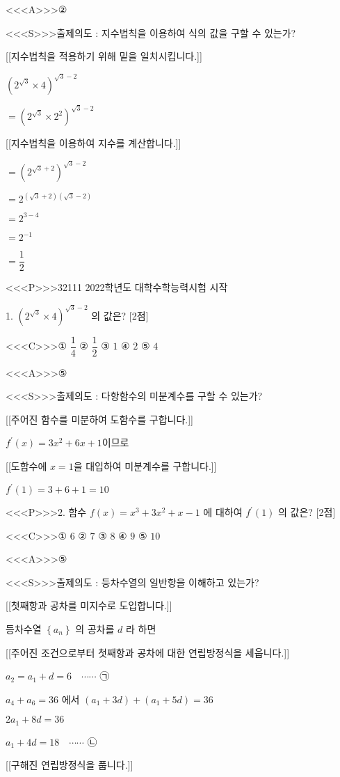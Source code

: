 \documentclass{oblivoir}
\begin{document}
<<<A>>>②

<<<S>>>출제의도 : 지수법칙을 이용하여 식의 값을 구할 수 있는가?

[[지수법칙을 적용하기 위해 밑을 일치시킵니다.]]

$\left(2^{\sqrt{3}} \times 4\right)^{\sqrt{3}-2}$

$=\left(2^{\sqrt{3}} \times 2^{2}\right)^{\sqrt{3}-2}$

[[지수법칙을 이용하여 지수를 계산합니다.]]

$=\left(2^{\sqrt{3}+2}\right)^{\sqrt{3}-2}$

$=2^{(\sqrt{3}+2)(\sqrt{3}-2)}$

$=2^{3-4}$

$=2^{-1}$

$=\dfrac{1}{2}$

<<<P>>>32111 2022학년도 대학수학능력시험 시작

1. $\left(2^{\sqrt{3}} \times 4\right)^{\sqrt{3}-2}$ 의 값은? [2점]

<<<C>>>① $\dfrac{1}{4}$
② $\dfrac{1}{2}$
③ $1$
④ $2$
⑤ $4$


<<<A>>>⑤

<<<S>>>출제의도 : 다항함수의 미분계수를 구할 수 있는가?

[[주어진 함수를 미분하여 도함수를 구합니다.]]

$f^{\prime}(x)=3 x^{2}+6 x+1$이므로

[[도함수에 $x=1$을 대입하여 미분계수를 구합니다.]]

$f^{\prime}(1)=3+6+1=10$

<<<P>>>2. 함수 $f(x)=x^{3}+3 x^{2}+x-1$ 에 대하여 $f^{\prime}(1)$ 의 값은? [2점]

<<<C>>>① $6$
② $7$
③ $8$
④ $9$
⑤ $10$

<<<A>>>⑤

<<<S>>>출제의도 : 등차수열의 일반항을 이해하고 있는가?

[[첫째항과 공차를 미지수로 도입합니다.]]

등차수열 $\left\{a_{n}\right\}$ 의 공차를 $d$ 라 하면

[[주어진 조건으로부터 첫째항과 공차에 대한 연립방정식을 세웁니다.]]

$a_{2}=a_{1}+d=6 \quad \cdots \cdots$ ㉠

$a_{4}+a_{6}=36$ 에서
$\left(a_{1}+3 d\right)+\left(a_{1}+5 d\right)=36$

$2 a_{1}+8 d=36$

$a_{1}+4 d=18 \quad \cdots \cdots$ ㉡

[[구해진 연립방정식을 풉니다.]]
\end{document}
